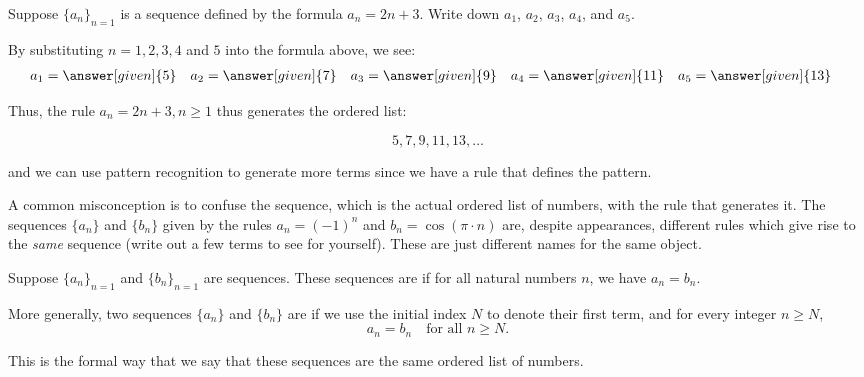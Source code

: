 \documentclass{ximera}
\begin{document}
\begin{example}
Suppose $\{a_n\}_{n=1}$ is a sequence defined by the formula $a_n = 2n+3$.  Write down $a_1$, $a_2$, $a_3$, $a_4$, and $a_5$.

  \begin{explanation}
    By substituting $n=1, 2, 3, 4$ and $5$ into the formula above, we see:
    \begin{align*}
      a_1 &= \answer[given]{5} & 
      a_2 &= \answer[given]{7} & 
      a_3 &= \answer[given]{9} & 
      a_4 &= \answer[given]{11} & 
      a_5 &= \answer[given]{13} 
    \end{align*}
    
Thus, the rule $a_n = 2n+3, n \geq 1$ thus generates the ordered list:

\[
5,7,9,11,13, \dots
\]   

and we can use pattern recognition to generate more terms since we have a rule that defines the pattern.
  \end{explanation}
  
\end{example}

\begin{warning}
  A common misconception is to confuse the sequence, which is the actual ordered list of numbers, with the rule that generates it.  The sequences $\{a_n\}$ and $\{b_n\}$ given by the rules $a_n = (-1)^n$ and $b_n = \cos (\pi \cdot n)$ are, despite  appearances, different rules which give rise to the \textit{same}  sequence (write out a few terms to see for yourself).  These are just different names for the same object.
\end{warning}


\begin{definition}
  Suppose $\{a_n\}_{n=1}$ and $\{b_n\}_{n=1}$ are sequences.  These
  sequences are  if for all
  natural numbers $n$, we have $a_n = b_n$.

  More generally, two sequences $\{a_n\}$ and $\{b_n\}$ are
   if we use the initial index $N$ to denote their first term, and for
  every integer $n \geq N$, 
  \[
  a_n = b_n \quad \text{for all $n \geq N$.}
  \]
  
  This is the formal way that we say that these sequences are the same ordered list of numbers.
\end{definition}
\end{document}
